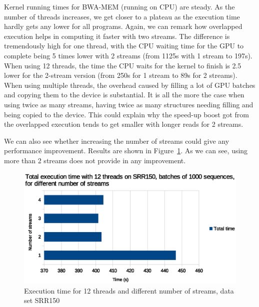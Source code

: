 Kernel running times for BWA-MEM (running on CPU) are steady. As the number of threads increases, we get closer to a plateau as the execution time hardly gets any lower for all programs. Again, we can remark how overlapped execution helps in computing it faster with two streams. The difference is tremendously high for one thread, with the CPU waiting time for the GPU to complete being 5 times lower with 2 streams (from 1125s with 1 stream to 197s). When using 12 threads, the time the CPU waits for the kernel to finish is 2.5 lower for the 2-stream version (from 250s for 1 stream to 89s for 2 streams). When using multiple threads, the overhead caused by filling a lot of GPU batches and copying them to the device is substantial. It is all the more the case when using twice as many streams, having twice as many structures needing filling and being copied to the device. This could explain why the speed-up boost got from the overlapped execution tends to get smaller with longer reads for 2 streams.

We can also see whether increasing the number of streams could give any performance improvement. Results are shown in Figure~\ref{fig:exec-time-nbstreams}. As we can see, using more than 2 streams does not provide in any improvement. 

\begin{figure}[h]
	\centering
	\includegraphics[width=0.9\linewidth]{exec-time-nbstreams}
	\caption{Execution time for 12 threads and different number of streams, data set SRR150}
	\label{fig:exec-time-nbstreams}
\end{figure}

